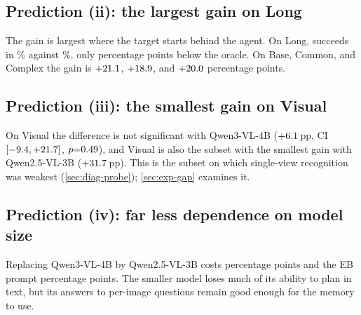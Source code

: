\begin{table}[htbp]
\centering\small
\caption[Outcomes on EB-Navigation]{Outcomes on EB-Navigation test (episodes of 300; mean over runs where a
configuration was run repeatedly).}
\label{tab:taxonomy}

\end{table}

\subsection{Prediction (ii): the largest gain on Long}
The gain is largest where the target starts behind the agent. On Long, \ours succeeds in \nSThreeLong\% against
\nEBThreeLong\%, only \nOracleGapLong{} percentage points below the oracle. On Base, Common, and Complex the gain is
$+21.1$, $+18.9$, and $+20.0$ percentage points.

\subsection{Prediction (iii): the smallest gain on Visual}
On Visual the difference is not significant with Qwen3-VL-4B ($+6.1$\,pp, CI $[-9.4, +21.7]$,
$p{=}0.49$), and Visual is also the subset with the smallest gain with Qwen2.5-VL-3B ($+31.7$\,pp). This
is the subset on which single-view recognition was weakest (\cref{sec:diag-probe}); \cref{sec:exp-gap} examines it.

\subsection{Prediction (iv): far less dependence on model size}
Replacing Qwen3-VL-4B by Qwen2.5-VL-3B costs \ours \nScaleDrop{} percentage points and the EB prompt \nScaleDropEB{}
percentage points.
The smaller model loses much of its ability to plan in text, but its answers to per-image questions remain good
enough for the memory to use.

